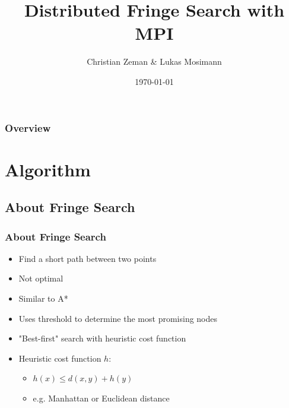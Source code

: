\documentclass{beamer}
\title[Distributed Fringe Search]{Distributed Fringe Search with MPI} %
\author{Christian Zeman \& Lukas Mosimann} %
\institute[ETH] %
{
ETH Zürich \\ %
\medskip
\textit{Design of Parallel and High-Performance Computing} %
}
\date{\today} %
\begin{document}
\begin{frame}
\titlepage %
\end{frame}

\begin{frame}
\frametitle{Overview} %
\tableofcontents %
\end{frame}


\section{Algorithm} %

\subsection{About Fringe Search} %

\begin{frame}
\frametitle{About Fringe Search}
\begin{itemize}
\item Find a short path between two points
\item Not optimal
\item Similar to A*
\item Uses threshold to determine the most promising nodes
\item "Best-first" search with heuristic cost function
\item Heuristic cost function $h$:
	\begin{itemize}
	\item $h(x) \le d(x,y) + h(y)$
	\item e.g. Manhattan or Euclidean distance
	\end{itemize}
\end{itemize}
\end{frame}
\end{document}
